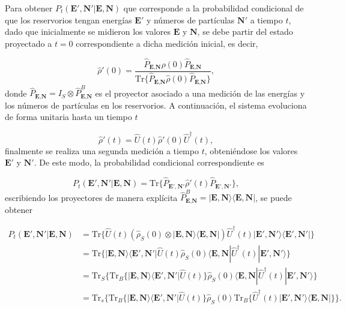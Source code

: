 Para obtener $P_{t}(\textbf{E}',\textbf{N}'|\textbf{E},\textbf{N})$ que corresponde a la probabilidad condicional de que los reservorios tengan energías $\textbf{E}'$ y números de partículas $\textbf{N}'$ a tiempo $t$, dado que inicialmente se midieron los valores $\textbf{E}$ y $\textbf{N}$, se debe partir del estado proyectado a $t=0$ correspondiente a dicha medición inicial, es decir,

\begin{equation*}
    \hat{\rho}'(0) = \frac{\hat{P}_{\textbf{E}, \textbf{N} }\hat{\rho}(0) \hat{P}_{\textbf{E}, \textbf{N} } }{\text{Tr}\{\hat{P}_{\textbf{E}, \textbf{N} }\hat{\rho}(0) \hat{P}_{\textbf{E}, \textbf{N} } \} },
\end{equation*}
donde $\hat{P}_{\textbf{E}, \textbf{N} } = I_{S} \otimes \hat{P}^{B}_{\textbf{E}, \textbf{N} }$ es el proyector asociado a una medición de las energías y los números de partículas en los reservorios. A continuación, el sistema evoluciona de forma unitaria hasta un tiempo $t$

\begin{equation*}
    \hat{\rho}'(t) = \hat{U}(t)\hat{\rho}'(0)\hat{U}^{\dagger}(t),
\end{equation*}
finalmente se realiza una segunda medición a tiempo $t$, obteniéndose los valores $\textbf{E}'$ y $\textbf{N}'$. De este modo, la probabilidad condicional correspondiente es

\begin{equation*}
    P_{t}(\textbf{E}',\textbf{N}'|\textbf{E},\textbf{N}) = \text{Tr}\{\hat{P}_{\textbf{E}', \textbf{N}' }\hat{\rho}'(t) \hat{P}_{\textbf{E}', \textbf{N}' } \},
\end{equation*}
escribiendo los proyectores de manera explícita $\hat{P}^{B}_{\textbf{E}, \textbf{N} } = |\textbf{E}, \textbf{N} \rangle\langle \textbf{E}, \textbf{N}|$, se puede obtener 

\begin{align*} 
    P_{t}(\textbf{E}',\textbf{N}'|\textbf{E},\textbf{N}) & =  \text{Tr}\{\hat{U}(t)(\hat{\rho}_{S}(0)\otimes |\textbf{E}, \textbf{N}\rangle  \langle \textbf{E}, \textbf{N}| ) \hat{U}^{\dagger}(t)  |\textbf{E}', \textbf{N}'\rangle  \langle \textbf{E}', \textbf{N}'| \} \\
        & =  \text{Tr}\{|\textbf{E},\textbf{N} \rangle \langle \textbf{E}', \textbf{N}'| \hat{U}(t)\hat{\rho}_{S}(0) \langle \textbf{E}, \textbf{N}|\hat{U}^{\dagger}(t)|\textbf{E}', \textbf{N}'\rangle \}      \\ 
        & = \text{Tr}_{S}\{ \text{Tr}_{B}\{|\textbf{E},\textbf{N} \rangle \langle \textbf{E}', \textbf{N}'|\hat{U}(t) \}\hat{\rho}_{S}(0)\langle \textbf{E}, \textbf{N}|\hat{U}^{\dagger}(t)|\textbf{E}', \textbf{N}'\rangle      \} \\
        & = \text{Tr}_{s}\{ \text{Tr}_{B}\{|\textbf{E},\textbf{N}\rangle \langle \textbf{E}',\textbf{N}'|\hat{U}(t)  \} \hat{\rho}_{S}(0) \text{Tr}_{B}\{\hat{U}^{\dagger}(t) |\textbf{E}',\textbf{N}' \rangle \langle \textbf{E},\textbf{N}| \}     \}.
    \end{align*}    

